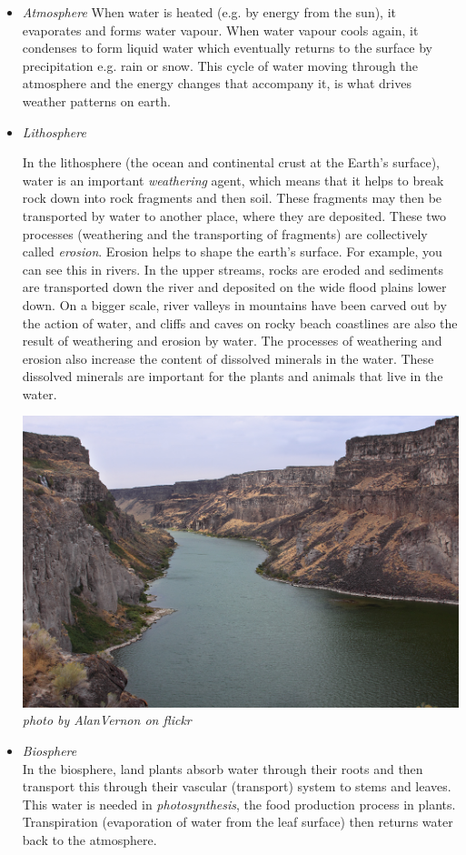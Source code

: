       \label{m38138*id334463}\begin{itemize}[noitemsep]
            \label{m38138*uid1}\item \textsl{Atmosphere}
When water is heated (e.g. by energy from the sun), it evaporates and forms water vapour. When water vapour cools again, it condenses to form liquid water which eventually returns to the surface by precipitation e.g. rain or snow. This cycle of water moving through the atmosphere and the energy changes that accompany it, is what drives weather patterns on earth.
\label{m38138*uid2}\item \textsl{Lithosphere} \\
\begin{minipage}{.6\textwidth}
In the lithosphere (the ocean and continental crust at the Earth's surface), water is an important \textsl{weathering} agent, which means that it helps to break rock down into rock fragments and then soil. These fragments may then be transported by water to another place, where they are deposited. These two processes (weathering and the transporting of fragments) are collectively called \textsl{erosion}. Erosion helps to shape the earth's surface. For example, you can see this in rivers. In the upper streams, rocks are eroded and sediments are transported down the river and deposited on the wide flood plains lower down. On a bigger scale, river valleys in mountains have been carved out by the action of water, and cliffs and caves on rocky beach coastlines are also the result of weathering and erosion by water. The processes of weathering and erosion also increase the content of dissolved minerals in the water. These dissolved minerals are important for the plants and animals that live in the water.
\end{minipage}
\begin{minipage}{.4\textwidth}
 \begin{center}
  \includegraphics[width=.6\textwidth]{photos/AlanVernon.jpg}\\
\textsl{photo by AlanVernon on flickr}
 \end{center}
\end{minipage}
\label{m38138*uid3}\item \textsl{Biosphere}\\
In the biosphere, land plants absorb water through their roots and then transport this through their vascular (transport) system to stems and leaves. This water is needed in \textsl{photosynthesis}, the food production process in plants. Transpiration (evaporation of water from the leaf surface) then returns water back to the atmosphere.
\end{itemize}


